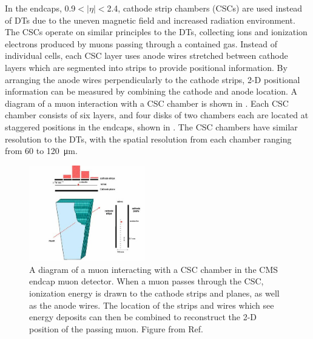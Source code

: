 In the endcaps, 0.9$<\lvert\eta\rvert<$2.4, cathode strip chambers (CSCs) are used instead of DTs due to the uneven magnetic field and increased radiation environment.
The CSCs operate on similar principles to the DTs, collecting ions and ionization electrons produced by muons passing through a contained gas. 
Instead of individual cells, each CSC layer uses anode wires stretched between cathode layers which are segmented into strips to provide positional information. 
By arranging the anode wires perpendicularly to the cathode strips, 2-D positional information can be measured by combining the cathode and anode location. 
A diagram of a muon interaction with a CSC chamber is shown in .
Each CSC chamber consists of six layers, and four disks of two chambers each are located at staggered positions in the endcaps, shown in . 
The CSC chambers have similar resolution to the DTs, with the spatial resolution from each chamber ranging from 60 to \SI{120}{\micro\meter}.

\begin{figure}[htbp]
    \includegraphics[width=0.45\textwidth]{figures/cscInteractionExample.jpg}
    \centering
	\caption[A muon interacting with a CSC chamber]{A diagram of a muon interacting with a CSC chamber in the CMS endcap muon detector. When a muon passes through the CSC, ionization energy is drawn to the cathode strips and planes, as well as the anode wires. The location of the strips and wires which see energy deposits can then be combined to reconstruct the 2-D position of the passing muon. Figure from Ref. \cite{hauser2004}}
    \label{fig:CSCInteraction}
\end{figure}

